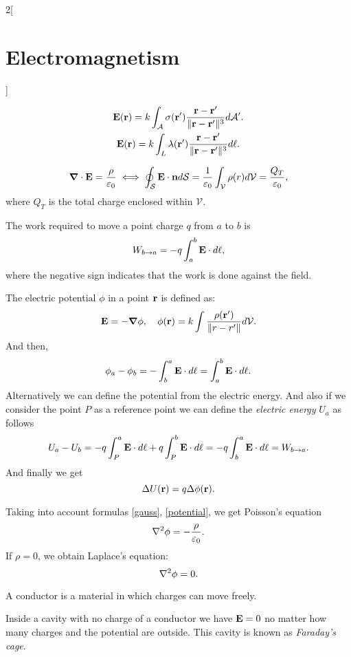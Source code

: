 \documentclass[../../../main.tex]{subfiles}
\begin{document}
\begin{multicols}{2}[\section{Electromagnetism}]
\begin{prop}
\begin{gather*}
      \boldsymbol{\mathrm{E}}(\boldsymbol{\mathrm{r}})=k\int_\mathcal{A}\sigma(\boldsymbol{\mathrm{r}}')\frac{\boldsymbol{\mathrm{r}}-\boldsymbol{\mathrm{r}}'}{\|\boldsymbol{\mathrm{r}}-\boldsymbol{\mathrm{r}}'\|^3}d\mathcal{A}'.\\
      \boldsymbol{\mathrm{E}}(\boldsymbol{\mathrm{r}})=k\int_L\lambda(\boldsymbol{\mathrm{r}}')\frac{\boldsymbol{\mathrm{r}}-\boldsymbol{\mathrm{r}}'}{\|\boldsymbol{\mathrm{r}}-\boldsymbol{\mathrm{r}}'\|^3}d\ell.
    \end{gather*}
  \end{prop}
  \begin{prop}
    \begin{equation}
      \grad\cdot\boldsymbol{\mathrm{E}}=\frac{\rho}{\varepsilon_0}\iff\oint_\mathcal{S}\boldsymbol{\mathrm{E}}\cdot\boldsymbol{\mathrm{n}}d\mathcal{S}=\frac{1}{\varepsilon_0}\int_\mathcal{V}\rho(r)d\mathcal{V}=\frac{Q_T}{\varepsilon_0},
      \label{gauss}
    \end{equation} where $Q_T$ is the total charge enclosed within $\mathcal{V}$.
  \end{prop}
  \begin{prop}[Work]
    The work required to move a point charge $q$ from $a$ to $b$ is $$W_{b\to a}=-q\int_a^b\boldsymbol{\mathrm{E}}\cdot d\ell,$$ where the negative sign indicates that the work is done against the field.
  \end{prop}
  \begin{prop}
    The electric potential $\phi$ in a point $\boldsymbol{\mathrm{r}}$ is defined as:
    \begin{equation}
      \boldsymbol{\mathrm{E}}=-\grad\phi,\quad\phi(\boldsymbol{\mathrm{r}})=k\int\frac{\rho(\boldsymbol{\mathrm{r}}')}{\|r-r'\|}d\mathcal{V}.
      \label{potential}
    \end{equation} And then, $$\phi_a-\phi_b=-\int_b^a\boldsymbol{\mathrm{E}}\cdot d\ell=\int_a^b\boldsymbol{\mathrm{E}}\cdot d\ell.$$ Alternatively we can define the potential from the electric energy.  And also if we consider the point $P$ as a reference point we can define the \textit{electric energy} $U_a$ as follows $$U_a-U_b=-q\int_P^a\boldsymbol{\mathrm{E}}\cdot d\ell+q\int_P^b\boldsymbol{\mathrm{E}}\cdot d\ell=-q\int_b^a\boldsymbol{\mathrm{E}}\cdot d\ell=W_{b\to a}.$$ And finally we get $$\Delta U(\boldsymbol{\mathrm{r}})=q\Delta\phi(\boldsymbol{\mathrm{r}}).$$
  \end{prop}
  \begin{prop}
    Taking into account formulas \ref{gauss}, \ref{potential}, we get Poisson's equation $$\laplacian\phi=-\frac{\rho}{\varepsilon_0}.$$ If $\rho=0$, we obtain Laplace's equation: $$\laplacian\phi=0.$$
  \end{prop}
  \begin{definition}
    A conductor is a material in which charges can move freely.
  \end{definition}
  \begin{prop}
    Inside a cavity with no charge of a conductor we have $\boldsymbol{\mathrm{E}}=0$ no matter how many charges and the potential are outside. This cavity is known as \textit{Faraday's cage}.
  \end{prop}

\end{multicols}
\end{document}
